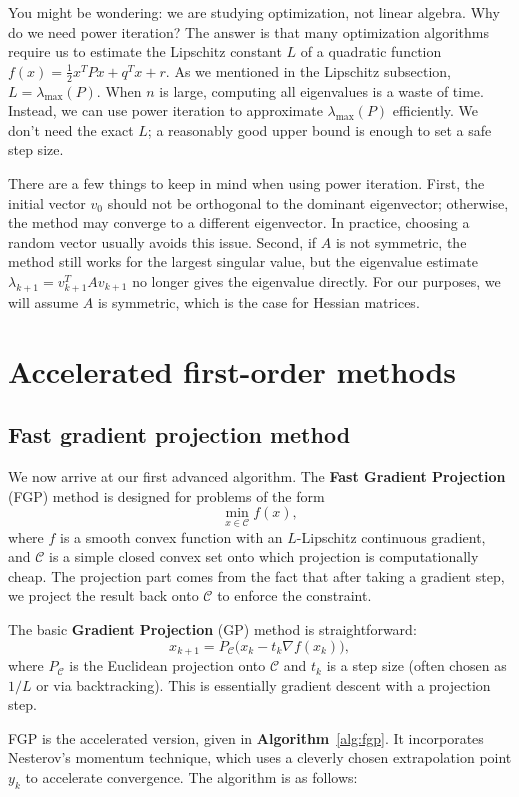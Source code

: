 \documentclass[lang=en,color=blue,mode=fancy,titlestyle=hang]{elegantbook}
\newcommand{\algoref}[1]{\textbf{Algorithm}~\ref{#1}}
\begin{document}
You might be wondering: we are studying optimization, not linear algebra. Why do we need power iteration?
The answer is that many optimization algorithms require us to estimate the Lipschitz constant $L$ of a
quadratic function $f(x) = \frac12 x^T P x + q^T x + r$. As we mentioned in the Lipschitz subsection,
$L = \lambda_{\max}(P)$. When $n$ is large, computing all eigenvalues is a waste of time. Instead,
we can use power iteration to approximate $\lambda_{\max}(P)$ efficiently. We don't need the exact $L$;
a reasonably good upper bound is enough to set a safe step size.

There are a few things to keep in mind when using power iteration. First, the initial vector $v_0$
should not be orthogonal to the dominant eigenvector; otherwise, the method may converge to a
different eigenvector. In practice, choosing a random vector usually avoids this issue. Second,
if $A$ is not symmetric, the method still works for the largest singular value, but the eigenvalue
estimate $\lambda_{k+1} = v_{k+1}^T A v_{k+1}$ no longer gives the eigenvalue directly. For our
purposes, we will assume $A$ is symmetric, which is the case for Hessian matrices.

\section{Accelerated first-order methods}
\subsection{Fast gradient projection method}
We now arrive at our first advanced algorithm. The \textbf{Fast Gradient Projection} (FGP) method
is designed for problems of the form
\[
\min_{x \in \mathcal{C}} f(x),
\]
where $f$ is a smooth convex function with an $L$-Lipschitz continuous gradient, and $\mathcal{C}$
is a simple closed convex set onto which projection is computationally cheap. The projection
part comes from the fact that after taking a gradient step, we project the result back onto
$\mathcal{C}$ to enforce the constraint.

The basic \textbf{Gradient Projection} (GP) method is straightforward:
\[
x_{k+1} = P_{\mathcal{C}}\bigl( x_k - t_k \nabla f(x_k) \bigr),
\]
where $P_{\mathcal{C}}$ is the Euclidean projection onto $\mathcal{C}$ and $t_k$ is a step size
(often chosen as $1/L$ or via backtracking). This is essentially gradient descent with a projection
step.

FGP is the accelerated version, given in \algoref{alg:fgp}. It incorporates Nesterov's momentum technique, which uses a cleverly
chosen extrapolation point $y_k$ to accelerate convergence. The algorithm is as follows:
\end{document}
